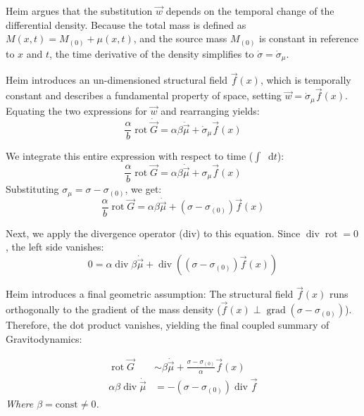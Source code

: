 \documentclass[11pt,a4paper,oneside]{article}
\newcommand{\diff}{\mathop{}\!\mathrm{d}} %
\begin{document}
Heim argues that the substitution $\vec{w}$ depends on the temporal change of the differential density. Because the total mass is defined as $M(x,t) = M_{(0)} + \mu(x,t)$, and the source mass $M_{(0)}$ is constant in reference to $x$ and $t$, the time derivative of the density simplifies to $\dot{\sigma} = \dot{\sigma}_\mu$.

Heim introduces an un-dimensioned structural field $\vec{f}(x)$, which is temporally constant and describes a fundamental property of space, setting $\vec{w} = \dot{\sigma}_\mu \vec{f}(x)$. Equating the two expressions for $\vec{w}$ and rearranging yields:
\begin{equation}
    \frac{\alpha}{b} \operatorname{rot} \dot{\vec{G}} = \alpha \beta \ddot{\vec{\mu}} + \dot{\sigma}_\mu \vec{f}(x)
\end{equation}

We integrate this entire expression with respect to time ($\int \diff t$):
\begin{equation}
    \frac{\alpha}{b} \operatorname{rot} \vec{G} = \alpha \beta \dot{\vec{\mu}} + \sigma_\mu \vec{f}(x)
\end{equation}
Substituting $\sigma_\mu = \sigma - \sigma_{(0)}$, we get:
\begin{equation}
    \frac{\alpha}{b} \operatorname{rot} \vec{G} = \alpha \beta \dot{\vec{\mu}} + (\sigma - \sigma_{(0)}) \vec{f}(x)
\end{equation}

Next, we apply the divergence operator (div) to this equation. Since $\operatorname{div} \operatorname{rot} = 0$, the left side vanishes:
\begin{equation}
    0 = \alpha \operatorname{div} \beta \dot{\vec{\mu}} + \operatorname{div}((\sigma - \sigma_{(0)})\vec{f}(x))
\end{equation}

Heim introduces a final geometric assumption: The structural field $\vec{f}(x)$ runs orthogonally to the gradient of the mass density ($\vec{f}(x) \perp \operatorname{grad}(\sigma - \sigma_{(0)})$). Therefore, the dot product vanishes, yielding the final coupled summary of Gravitodynamics:

\begin{tcolorbox}[colback=white, colframe=theoryblue, title=\textbf{Summary of Dynamic Gravitation Law}]
\begin{align}
    \operatorname{rot} \vec{G} &\sim \beta \dot{\vec{\mu}} + \frac{\sigma - \sigma_{(0)}}{\alpha} \vec{f}(x) \label{eq:grav_summary1} \\
    \alpha \beta \operatorname{div} \dot{\vec{\mu}} &= -(\sigma - \sigma_{(0)}) \operatorname{div} \vec{f} \label{eq:grav_summary2}
\end{align}
\textit{Where $\beta = \text{const} \neq 0$.}
\end{tcolorbox}
\end{document}
